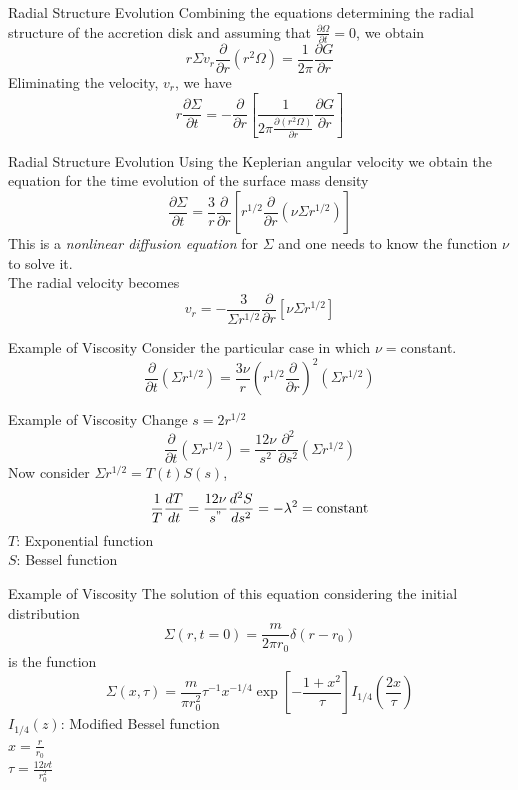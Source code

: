 \documentclass{beamer}
\begin{document}
\begin{frame}{Radial Structure Evolution}
	Combining the equations determining the radial structure of the accretion disk and assuming that $\frac{\partial \Omega}{\partial t} = 0 $, we obtain
	\[ r \Sigma v_r \frac{\partial}{\partial r} \left( r^2 \Omega\right) = \frac{1}{2\pi} \frac{\partial G}{\partial r}\] 
	\pause
	Eliminating the velocity, $v_r$, we have
	\[ r \frac{\partial \Sigma}{\partial t} = -\frac{\partial }{\partial r} \left[ \frac{1}{2\pi \frac{\partial \left( r^2 \Omega\right)}{\partial r}  } \frac{\partial G}{\partial r} \right]\] 
\end{frame}

\begin{frame}{Radial Structure Evolution}
	Using the Keplerian angular velocity we obtain the equation for the time evolution of the surface mass density
	\pause
	\[ \frac{\partial \Sigma}{\partial t} = \frac{3}{r} \frac{\partial }{\partial r} \left[ r^{1/2} \frac{\partial }{\partial r} \left( \nu \Sigma r^{1/2}\right) \right]\] 
	\pause
	This is a \textit{nonlinear diffusion equation} for $\Sigma$ and one needs to know the function $\nu$ to solve it.\\
	\pause
	The radial velocity becomes 
	\[v_r = - \frac{3 }{\Sigma r^{1/2}} \frac{\partial }{\partial r} \left[ \nu \Sigma r^{1/2}\right]\]
\end{frame}

\begin{frame}{Example of Viscosity}
	Consider the particular case in which $\nu=$constant.
	\pause
	\[ \frac{\partial }{\partial t} \left( \Sigma r^{1/2} \right) = \frac{3\nu }{r} \left( r^{1/2}  \frac{\partial }{\partial r} \right)^2 \left( \Sigma r^{1/2}\right) \] 
\end{frame}

\begin{frame}{Example of Viscosity}
	Change $s = 2r^{1/2}$
	\pause
	\[ \frac{\partial }{\partial t} \left( \Sigma r^{1/2} \right) = \frac{12\nu }{s^2} \frac{\partial ^2 }{\partial s^2}  \left( \Sigma r^{1/2}\right) \] 
	\pause
	Now consider $\Sigma r^{1/2} = T(t) S(s)$,
	\pause
	\[ \frac{1}{T} \frac{dT}{dt}= \frac{12\nu}{s^"} \frac{d^2 S}{ds^2}= -\lambda^2 = \textrm{constant} \]
	\pause
	$T$: Exponential function\\
	$S$: Bessel function
\end{frame}

\begin{frame}{Example of Viscosity}
	The solution of this equation considering the initial distribution
	\[\Sigma(r,t=0) = \frac{m}{2\pi r_0} \delta (r-r_0)\]
	\pause
	is the function
	\[\Sigma(x,\tau) = \frac{m}{\pi r_0^2} \tau^{-1} x^{-1/4} \exp{\left[-\frac{1+x^2}{\tau}\right] } I_{1/4} \left( \frac{2x}{\tau} \right) \]
	\pause
	$I_{1/4} (z)$: Modified Bessel function\\
	$x=\frac{r}{r_0}$\\ 
	$\tau = \frac{12\nu t} {r_0^2}$
\end{frame}
\end{document}
